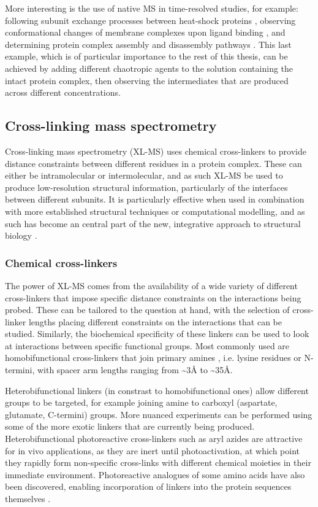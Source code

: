 \documentclass[a4paper,11pt,twoside,openright]{scrbook}
\begin{document}
More interesting is the use of native MS in time-resolved studies, for example: following subunit exchange processes between heat-shock proteins \cite{Sobott2002a}, observing conformational changes of membrane complexes upon ligand binding \cite{Laganowsky2014}, and determining protein complex assembly and disassembly pathways \cite{Levy2008}. This last example, which is of particular importance to the rest of this thesis, can be achieved by adding different chaotropic agents to the solution containing the intact protein complex, then observing the intermediates that are produced across different concentrations.

\subsection{Cross-linking mass spectrometry}
Cross-linking mass spectrometry (XL-MS) uses chemical cross-linkers to provide distance constraints between different residues in a protein complex. These can either be intramolecular or intermolecular, and as such XL-MS be used to produce low-resolution structural information, particularly of the interfaces between different subunits. It is particularly effective when used in combination with more established structural techniques or computational modelling, and as such has become an central part of the new, integrative approach to structural biology \cite{Stengel2012,Ward2013,VandenBedem2015}.

\subsubsection{Chemical cross-linkers}
The power of XL-MS comes from the availability of a wide variety of different cross-linkers that impose specific distance constraints on the interactions being probed. These can be tailored to the question at hand, with the selection of cross-linker lengths placing different constraints on the interactions that can be studied. Similarly, the biochemical specificity of these linkers can be used to look at interactions between specific functional groups. Most commonly used are homobifunctional cross-linkers that join primary amines \cite{Leitner2016}, i.e. lysine residues or N-termini, with spacer arm lengths ranging from \textasciitilde 3Å to \textasciitilde 35Å.

Heterobifunctional linkers (in constrast to homobifunctional ones) allow different groups to be targeted, for example joining amine to carboxyl (aspartate, glutamate, C-termini) groups. More nuanced experiments can be performed using some of the more exotic linkers that are currently being produced. Heterobifunctional photoreactive cross-linkers such as aryl azides are attractive for in vivo applications, as they are inert until photoactivation, at which point they rapidly form non-specific cross-links with different chemical moieties in their immediate environment. Photoreactive analogues of some amino acids have also been discovered, enabling incorporation of linkers into the protein sequences themselves \cite{Suchanek2005}.
\end{document}
